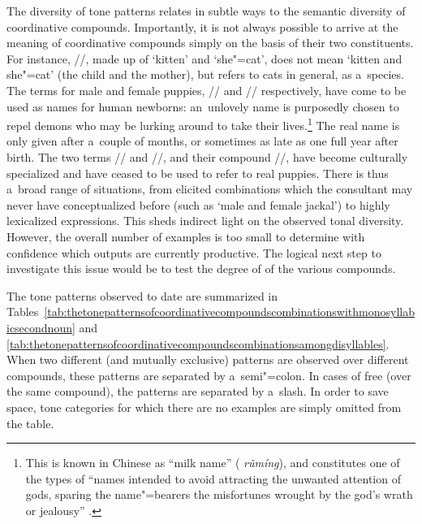 The diversity of tone patterns relates in subtle ways to the semantic diversity of coordinative compounds. Importantly, it is not always
possible to arrive at the meaning of coordinative compounds simply on the basis of their two
constituents. For instance, //, made up of ‘kitten’ and ‘she"=cat’, does not
mean ‘kitten and she"=cat’ (the child and the mother), but refers to cats in general, as
a~species. The terms for male and female puppies, // and
// respectively, have come to be used as names for human newborns: an~unlovely name is purposedly
chosen to repel demons who may be lurking around to take their lives.\footnote{This is known in Chinese as “milk name” ( \textit{rǔmíng}), and constitutes one of the types of “names intended to avoid attracting the unwanted attention of gods, sparing the name"=bearers the misfortunes wrought by the god's wrath or jealousy” \citep[118]{chen2016}.} The real name is only given
after a~couple of months, or sometimes as late as one full year after birth. The two terms
// and //, and their compound //, have become
culturally specialized and have ceased to be used to refer to real puppies. There is thus a~broad range of situations, from elicited
combinations which the consultant may never have conceptualized before (such as ‘male and female
jackal’) to highly lexicalized expressions. This sheds indirect light on the observed tonal diversity. However, the overall number of examples
is too small to determine with confidence which outputs are currently productive. The logical next step to investigate this issue would be to test the degree of  of the various compounds. 

The tone patterns observed to date are summarized in
Tables~\ref{tab:thetonepatternsofcoordinativecompoundscombinationswithmonosyllabicsecondnoun}
and
\ref{tab:thetonepatternsofcoordinativecompoundscombinationsamongdisyllables}. When
two different (and mutually exclusive) patterns are observed over
different compounds, these patterns are separated by a~semi"=colon. In
cases of free  (over the same compound), the patterns are
separated by a~slash. In order to save space, tone categories for
which there are no examples are simply omitted from the table. 

